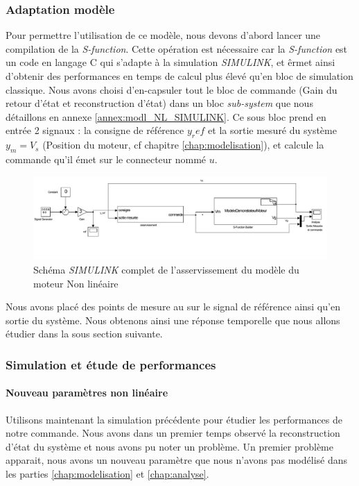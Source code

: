 		\subsubsection{Adaptation modèle}
		Pour permettre l'utilisation de ce modèle, nous devons d'abord lancer une compilation de la \emph{S-function}. Cette opération est nécessaire car la \emph{S-function} est un code en langage C qui s'adapte à la simulation \emph{SIMULINK}, et êrmet ainsi d'obtenir des performances en temps de calcul plus élevé qu'en bloc de simulation classique.
		Nous avons choisi d'en-capsuler tout le bloc de commande (Gain du retour d'état et reconstruction d'état) dans un bloc \emph{sub-system} que nous détaillons en annexe \ref{annex:modl_NL_SIMULINK}. Ce sous bloc prend en entrée 2 signaux : la consigne de référence $y_ref$ et la sortie mesuré du système $y_m = V_s$ (Position du moteur, cf chapitre \ref{chap:modelisation}), et calcule la commande qu'il émet sur le connecteur nommé $u$.
		\begin{figure}[ht]
		\centering
		\includegraphics[width = \textwidth]{./IV/images/NL_RE_BlocEntier.pdf}
		\caption{Schéma \emph{SIMULINK} complet de l'asservissement du modèle du moteur Non linéaire}\label{fig:SIMULINK_NL_schema}
		\end{figure}
		
		Nous avons placé des points de mesure au sur le signal de référence ainsi qu'en sortie du système. Nous obtenons ainsi une réponse temporelle que nous allons étudier dans la sous section suivante.
		\subsubsection{Simulation et étude de performances}
		\paragraph{Nouveau paramètres non linéaire}
		Utilisons maintenant la simulation précédente pour étudier les performances de notre commande. Nous avons dans un premier temps observé la reconstruction d'état du système et nous avons pu noter un problème. Un premier problème apparait, nous avons un nouveau paramètre que nous n'avons pas modélisé dans les parties \ref{chap:modelisation} et \ref{chap:analyse}. 
		
